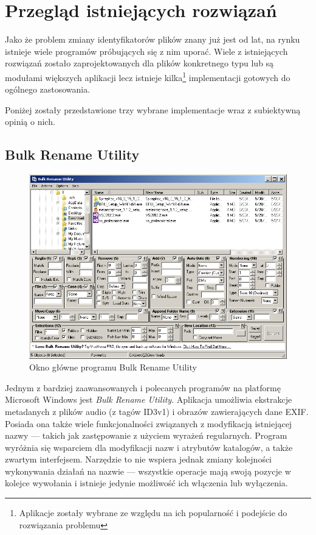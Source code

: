 \chapter{Przegląd istniejących rozwiązań}
\par
Jako że problem zmiany identyfikatorów plików znany już jest od lat, na rynku istnieje wiele programów próbujących się z nim uporać. Wiele z istniejących rozwiązań zostało zaprojektowanych dla plików konkretnego typu lub są modułami większych aplikacji lecz istnieje kilka\footnote{Aplikacje zostały wybrane ze względu na ich popularność i podejście do rozwiązania problemu} implementacji gotowych do ogólnego zastosowania.
\par
Poniżej zostały przedstawione trzy wybrane implementacje wraz z subiektywną opinią o nich.

\section{Bulk Rename Utility}
\begin{figure}[h]
\begin{center}
\includegraphics[scale=0.75]{img/bulkrename_window.png}
\end{center}
\caption{Okno główne programu Bulk Rename Utility}
\end{figure}

\par
Jednym z bardziej zaawansowanych i polecanych programów na platformę Microsoft Windows jest \textit{Bulk Rename Utility}. Aplikacja umożliwia ekstrakcje metadanych z plików audio (z tagów ID3v1) i obrazów zawierających dane EXIF. Posiada ona także wiele funkcjonalności związanych z modyfikacją istniejącej nazwy --- takich jak zastępowanie z użyciem wyrażeń regularnych.
Program wyróżnia się wsparciem dla modyfikacji nazw i atrybutów katalogów, a także zwartym interfejsem.
Narzędzie to nie wspiera jednak zmiany kolejności wykonywania działań na nazwie --- wszystkie operacje mają swoją pozycje w kolejce wywołania i istnieje jedynie możliwość ich włączenia lub wyłączenia.\\


